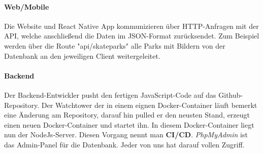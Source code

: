 \paragraph{Web/Mobile}
Die Website und React Native App kommunizieren über HTTP-Anfragen mit der API, welche anschließend
die Daten im JSON-Format zurücksendet. Zum Beispiel werden über die Route "api/skateparks" alle
Parks mit Bildern von der Datenbank an den jeweiligen Client weitergeleitet.

\paragraph{Backend}
Der Backend-Entwickler pusht den fertigen JavaScript-Code auf das Github-Repository.
Der Watchtower der in einem eignen Docker-Container läuft bemerkt eine Änderung am Repository, darauf hin
pulled er den neusten Stand, erzeugt einen neuen Docker-Container und startet ihn. In diesem
Docker-Container liegt nun der NodeJs-Server. Diesen Vorgang nennt man \textbf{CI/CD}. \textit{PhpMyAdmin} ist das
Admin-Panel für die Datenbank. Jeder von uns hat darauf vollen Zugriff.
